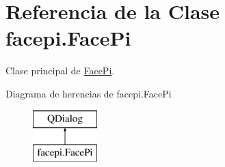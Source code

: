\hypertarget{classfacepi_1_1_face_pi}{}\section{Referencia de la Clase facepi.\+Face\+Pi}
\label{classfacepi_1_1_face_pi}


Clase principal de \mbox{\hyperlink{classfacepi_1_1_face_pi}{Face\+Pi}}.  


Diagrama de herencias de facepi.\+Face\+Pi\begin{figure}[H]
\begin{center}
\leavevmode
\includegraphics[height=2.000000cm]{classfacepi_1_1_face_pi}
\end{center}
\end{figure}
